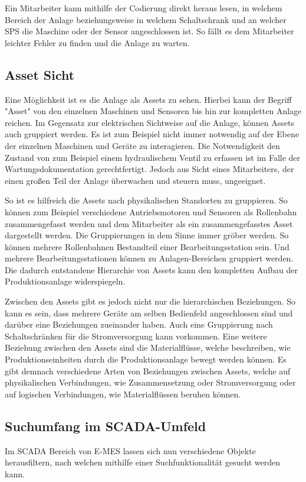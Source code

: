 Ein Mitarbeiter kann mithilfe der Codierung direkt heraus lesen, in welchem Bereich der Anlage beziehungsweise in welchem Schaltschrank und an welcher SPS die Maschine oder der Sensor angeschlossen ist. So fällt es dem Mitarbeiter leichter Fehler zu finden und die Anlage zu warten.

\subsection{Asset Sicht\label{subsec3.2.2:Unterunterpunkt-2}}
Eine Möglichkeit ist es die Anlage als Assets zu sehen. Hierbei kann der Begriff "Asset" von den einzelnen Maschinen und Sensoren bis hin zur kompletten Anlage reichen. Im Gegensatz zur elektrischen Sichtweise auf die Anlage, können Assets auch gruppiert werden. Es ist zum Beispiel nicht immer notwendig auf der Ebene der einzelnen Maschinen und Geräte zu interagieren. Die Notwendigkeit den Zustand von zum Beispiel einem hydraulischem Ventil zu erfassen ist im Falle der Wartungsdokumentation gerechtfertigt. Jedoch aus Sicht eines Mitarbeiters, der einen großen Teil der Anlage überwachen und steuern muss, ungeeignet.

So ist es hilfreich die Assets nach physikalischen Standorten zu gruppieren. So können zum Beispiel verschiedene Antriebsmotoren und Sensoren als Rollenbahn zusammengefasst werden und dem Mitarbeiter als ein zusammengefasstes Asset dargestellt werden. Die Gruppierungen in dem Sinne immer gröber werden. So können mehrere Rollenbahnen Bestandteil einer Bearbeitungsstation sein. Und mehrere Bearbeitungsstationen können zu Anlagen-Bereichen gruppiert werden. Die dadurch entstandene Hierarchie von Assets kann den kompletten Aufbau der Produktionsanlage widerspiegeln.

Zwischen den Assets gibt es jedoch nicht nur die hierarchischen Beziehungen. So kann es sein, dass mehrere Geräte am selben Bedienfeld angeschlossen sind und darüber eine Beziehungen zueinander haben. Auch eine Gruppierung nach Schaltschränken für die Stromversorgung kann vorkommen. Eine weitere Beziehung zwischen den Assets sind die Materialflüsse, welche beschreiben, wie Produktionseinheiten durch die Produktionsanlage bewegt werden können. Es gibt demnach verschiedene Arten von Beziehungen zwischen Assets, welche auf physikalischen Verbindungen, wie Zusammensetzung oder Stromversorgung oder auf logischen Verbindungen, wie Materialflüssen beruhen können.

\subsection{Suchumfang im SCADA-Umfeld\label{subsec3.2.3:Unterunterpunkt-3}}
Im SCADA Bereich von E-MES lassen sich nun verschiedene Objekte herausfiltern, nach welchen mithilfe einer Suchfunktionalität gesucht werden kann.

